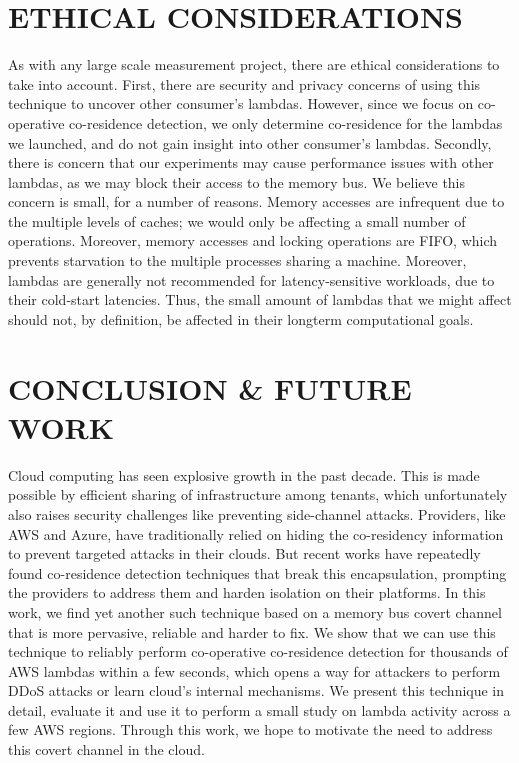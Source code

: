 
\section{ETHICAL CONSIDERATIONS}
As with any large scale measurement project, there are ethical considerations to
take into account. First, there are security and privacy concerns of using this
technique to uncover other consumer's lambdas. However, since we focus on
co-operative co-residence detection, we only determine co-residence for the
lambdas we launched, and do not gain insight into other consumer's lambdas.
Secondly, there is concern that our experiments may cause performance issues
with other lambdas, as we may block their access to the memory bus. We believe
this concern is small, for a number of reasons. Memory accesses are infrequent
due to the multiple levels of caches; we would only be affecting a small number
of operations. Moreover, memory accesses and locking operations are FIFO, which
prevents starvation to the multiple processes sharing a machine. Moreover,
lambdas are generally not recommended for latency-sensitive workloads, due to
their cold-start latencies. Thus, the small amount of lambdas that we might
affect should not, by definition, be affected in their longterm computational
goals. 


\section{CONCLUSION \& FUTURE WORK}
\label{sec:conclusion}
Cloud computing has seen explosive growth in the past decade. This is made
possible by efficient sharing of infrastructure among tenants, which
unfortunately also raises security challenges like preventing side-channel
attacks. Providers, like AWS and Azure, have traditionally relied on hiding the
co-residency information to prevent targeted attacks in their clouds. But recent
works have repeatedly found co-residence detection techniques that break this
encapsulation, prompting the providers to address them and harden isolation on
their platforms. In this work, we find yet another such technique based on a
memory bus covert channel that is more pervasive, reliable and harder to fix. We
show that we can use this technique to reliably perform co-operative
co-residence detection for thousands of AWS lambdas within a few seconds, which
opens a way for attackers to perform DDoS attacks or learn cloud's internal
mechanisms. We present this technique in detail, evaluate it and use it to
perform a small study on lambda activity across a few AWS regions.  Through this
work, we hope to motivate the need to address this covert channel in the cloud.

